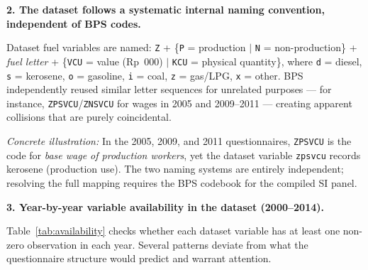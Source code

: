 \documentclass[11pt, a4paper]{article}
\begin{document}
\noindent\textbf{2. The dataset follows a systematic internal naming convention,
independent of BPS codes.}

Dataset fuel variables are named: \texttt{Z} + \{\texttt{P} = production $\mid$
\texttt{N} = non-production\} + \textit{fuel letter} + \{\texttt{VCU} = value (Rp~000)
$\mid$ \texttt{KCU} = physical quantity\}, where \texttt{d} = diesel, \texttt{s} =
kerosene, \texttt{o} = gasoline, \texttt{i} = coal, \texttt{z} = gas/LPG, \texttt{x} =
other. BPS independently reused similar letter sequences for unrelated purposes ---
for instance, \texttt{ZPSVCU}/\texttt{ZNSVCU} for wages in 2005 and 2009--2011 ---
creating apparent collisions that are purely coincidental.

\textit{Concrete illustration:} In the 2005, 2009, and 2011 questionnaires,
\texttt{ZPSVCU} is the code for \textit{base wage of production workers}, yet the
dataset variable \texttt{zpsvcu} records kerosene (production use).
The two naming systems are entirely independent; resolving the full mapping requires
the BPS codebook for the compiled SI panel.

\noindent\textbf{3. Year-by-year variable availability in the dataset (2000--2014).}

Table~\ref{tab:availability} checks whether each dataset variable has at least one
non-zero observation in each year. Several patterns deviate from what the questionnaire
structure would predict and warrant attention.
\end{document}
